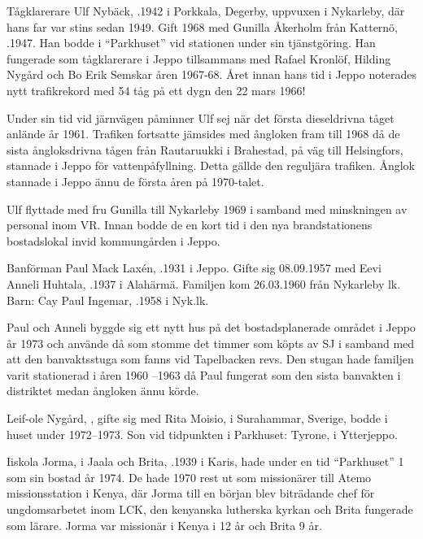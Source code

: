 
Tågklarerare Ulf Nybäck, .1942 i Porkkala, Degerby, uppvuxen i Nykarleby, där hans far var stins sedan 1949. Gift 1968 med Gunilla Åkerholm från Katternö, .1947. Han bodde i ``Parkhuset'' vid stationen under sin tjänstgöring. Han fungerade som tågklarerare i Jeppo tillsammans med Rafael Kronlöf, Hilding Nygård och Bo Erik Semskar åren 1967-68. Året innan hans tid i Jeppo noterades nytt trafikrekord med 54 tåg på ett dygn den 22 mars 1966!

Under sin tid vid järnvägen påminner Ulf sej när det första dieseldrivna tåget anlände år 1961. Trafiken fortsatte jämsides med ångloken fram till 1968 då de sista ångloksdrivna tågen från Rautaruukki i Brahestad, på väg till Helsingfors, stannade i Jeppo för vattenpåfyllning. Detta gällde den reguljära trafiken. Ånglok stannade i Jeppo ännu de första åren på 1970-talet.

Ulf flyttade med fru Gunilla till Nykarleby 1969 i samband med minskningen av personal inom VR. Innan bodde de en kort tid i den nya brandstationens bostadslokal invid kommungården i Jeppo.


Banförman Paul Mack Laxén, .1931 i Jeppo. Gifte sig 08.09.1957 med Eevi Anneli Huhtala, .1937 i Alahärmä.  Familjen kom 26.03.1960 från Nykarleby lk.
Barn: Cay Paul Ingemar, .1958 i Nyk.lk.

Paul och Anneli byggde sig ett nytt hus på det bostadsplanerade området i Jeppo år 1973  och använde då som stomme det timmer som köpts av SJ i samband med att den banvaktsstuga som fanns vid Tapelbacken revs. Den stugan hade familjen varit stationerad i åren 1960 –1963 då Paul fungerat som den sista banvakten i distriktet medan ångloken ännu körde.

Leif-ole Nygård, , gifte sig med Rita Moisio,  i Surahammar, Sverige, bodde i huset under 1972--1973. Son vid tidpunkten i Parkhuset: Tyrone,  i Ytterjeppo.

Iiskola Jorma,  i Jaala och Brita, .1939 i Karis, hade under en tid ``Parkhuset'' 1 som sin bostad år 1974. De hade 1970 rest ut som missionärer till Atemo missionsstation i Kenya, där Jorma till en början blev biträdande chef för ungdomsarbetet inom LCK, den kenyanska lutherska kyrkan och Brita fungerade som lärare. Jorma var missionär i Kenya i 12 år och Brita 9 år.





